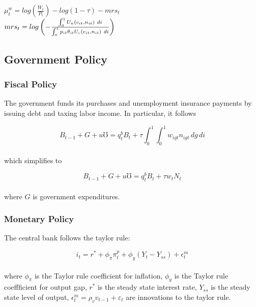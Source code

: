\documentclass[titlepage]{\econtex}\providecommand{\texname}{BufferStockTheory}
\begin{document}
$\mu_{t}^{w} = log\left( \frac{W_{t}}{P_{t}}\right)  - log\left(1 -\tau \right) - mrs_{t}$ \\


$ mrs_{t} = log \left(- \frac{\int_{0}^{1}   U_{n} \left(c_{i t}, n_{i t} \right) \ d i  }{\int_{0}^{1}  p_{it} \theta_{it} U_{c} \left(c_{i t}, n_{i t} \right) \  di } \right) \\ \\ $


\hypertarget{Government Policy}{}
\subsection{Government Policy}



\hypertarget{Fiscal Policy}{}
\subsubsection{Fiscal Policy}

The government funds its purchases and unemployment insurance payments by issuing debt and taxing labor income. In particular, it follows 

$$ B_{t-1} + G + \mathit{u} \mho =   q^{b}_{t} B_{t} +  \tau \int_{0}^{1} \int_{0}^{1} w_{igt} n_{igt} \, dg \, di$$ \\

which simplifies to 

$$ B_{t-1} + G + \mathit{u} \mho =   q^{b}_{t} B_{t} +  \tau w_{t}N_{t}$$  \\


where $G $ is government expenditures. \\



\hypertarget{Monetary Policy}{}
\subsubsection{Monetary Policy}


The central bank follows the taylor rule: 

$$i_{t} = r^{*} +\phi_{\pi} \pi^{p}_{t} + \phi_{y} (Y_{t} - Y_{ss}) + \epsilon^{m}_{t}$$ \\

where $\phi_{\pi}$ is the Taylor rule coefficient for inflation, $\phi_{y}$ is the Taylor rule coeffficient for output gap,  $r^{*}$ is the steady state interest rate, $Y_{ss}$ is the steady state level of output,  $\epsilon^{m}_{t} = \rho_{v} v_{t-1} +\varepsilon_{t}$ are innovations to the taylor rule. \\
\end{document}
